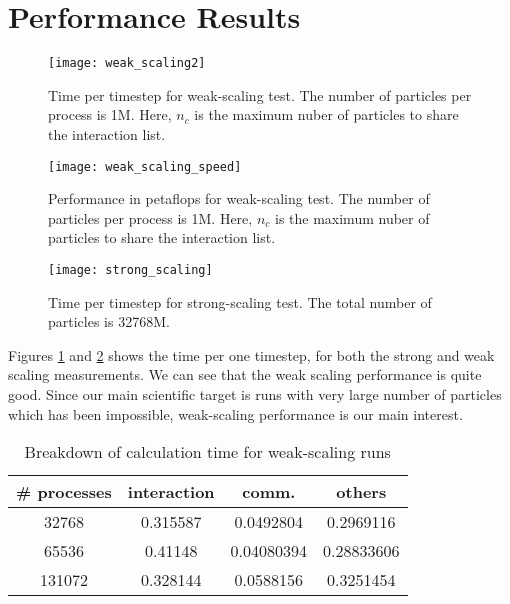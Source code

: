 \documentclass[sigconf]{acmart}
\begin{document}
  
  \section{Performance Results}


\begin{figure}
\texttt{[image: weak\_scaling2]}
\caption{Time per timestep for weak-scaling test. The number of
  particles per process is 1M. Here, $n_c$ is the maximum nuber of
  particles to share the interaction list.}
\label{fig:weak}
\end{figure}

\begin{figure}
\texttt{[image: weak\_scaling\_speed]}
\caption{Performance in petaflops for weak-scaling test. The number of
  particles per process is 1M. Here, $n_c$ is the maximum nuber of
  particles to share the interaction list.}
\label{fig:weakpf}
\end{figure}

\begin{figure}
\texttt{[image: strong\_scaling]}
\caption{Time per timestep for strong-scaling test. The total number of
  particles is 32768M.}
\label{fig:strong}
\end{figure}


Figures \ref{fig:weak} and \ref{fig:weakpf}  shows the time per one timestep, for both the strong and
weak scaling measurements. We can see that the weak scaling
performance is quite good. Since our main scientific target is runs
with very large number of particles which has been impossible,
weak-scaling performance is our main interest.

\begin{table}
  \caption{Breakdown of calculation time for weak-scaling runs}
  \label{tab:timeweak}
  \begin{tabular}{cccc}
    \toprule
    \# processes & interaction & comm. & others\\
    \midrule 
    32768 & 0.315587 & 0.0492804&   0.2969116\\
    65536 &    0.41148 &  0.04080394&  0.28833606 \\
131072  & 0.328144 & 0.0588156  & 0.3251454\\
  \bottomrule
\end{tabular}
\end{table}
\end{document}
